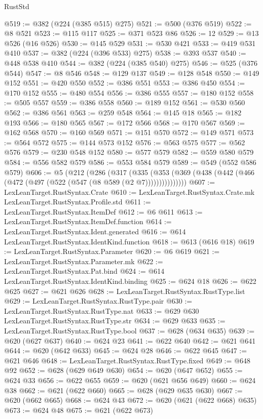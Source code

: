 \begin{lexlean}{RustStd}
\begin{coremodule}
@519 := @382 (@224 (@385 @515) @275)
@521 := @500 (@376 @519)
@522 := @8 @521
@523 := @115 @117
@525 := @371 @523 @86
@526 := 12
@529 := @13 @526 (@16 @526)
@530 := @145 @529
@531 := @530 @421
@533 := @419 @531 @410
@537 := @382 (@224 (@396 @533) @275)
@538 := @393 @537
@540 := @448 @538 @410
@544 := @382 (@224 (@385 @540) @275)
@546 := @525 (@376 @544)
@547 := @8 @546
@548 := @129 @137
@549 := @128 @548
@550 := @149 @152
@551 := @420 @550
@552 := @386 @551
@553 := @386 @450
@554 := @170 @152
@555 := @480 @554
@556 := @386 @555
@557 := @180 @152
@558 := @505 @557
@559 := @386 @558
@560 := @189 @152
@561 := @530 @560
@562 := @386 @561
@563 := @259 @548
@564 := @145 @18
@565 := @182 @193
@566 := @180 @565
@567 := @172 @566
@568 := @170 @567
@569 := @162 @568
@570 := @160 @569
@571 := @151 @570
@572 := @149 @571
@573 := @564 @572
@575 := @144 @573 @152
@576 := @563 @575
@577 := @562 @576
@579 := @230 @548 @152
@580 := @577 @579
@582 := @559 @580 @579
@584 := @556 @582 @579
@586 := @553 @584 @579
@589 := @549 (@552 @586 @579)
@606 := @5
    (@212
      (@286
        (@317
          (@335 (@353 (@369 (@438 (@442 (@466 (@472 (@497 (@522 (@547 (@8 @589 (@2 @7)))))))))))))))
@607 := LexLeanTarget.RustSyntax.Crate
@610 := LexLeanTarget.RustSyntax.Crate.mk LexLeanTarget.RustSyntax.Profile.std
@611 := LexLeanTarget.RustSyntax.ItemDef
@612 := @6 @611
@613 := LexLeanTarget.RustSyntax.ItemDef.function
@614 := LexLeanTarget.RustSyntax.Ident.generated
@616 := @614 LexLeanTarget.RustSyntax.IdentKind.function
@618 := @613 (@616 @18)
@619 := LexLeanTarget.RustSyntax.Parameter
@620 := @6 @619
@621 := LexLeanTarget.RustSyntax.Parameter.mk
@622 := LexLeanTarget.RustSyntax.Pat.bind
@624 := @614 LexLeanTarget.RustSyntax.IdentKind.binding
@625 := @624 @18
@626 := @622 @625
@627 := @621 @626
@628 := LexLeanTarget.RustSyntax.RustType.list
@629 := LexLeanTarget.RustSyntax.RustType.pair
@630 := LexLeanTarget.RustSyntax.RustType.nat
@633 := @629 @630 LexLeanTarget.RustSyntax.RustType.str
@634 := @629 @633
@635 := LexLeanTarget.RustSyntax.RustType.bool
@637 := @628 (@634 @635)
@639 := @620 (@627 @637)
@640 := @624 @23
@641 := @622 @640
@642 := @621 @641
@644 := @620 (@642 @633)
@645 := @624 @28
@646 := @622 @645
@647 := @621 @646
@648 := LexLeanTarget.RustSyntax.RustType.fixed
@649 := @648 @92
@652 := @628 (@629 @649 @630)
@654 := @620 (@647 @652)
@655 := @624 @33
@656 := @622 @655
@659 := @620 (@621 @656 @649)
@660 := @624 @38
@662 := @621 (@622 @660)
@665 := @628 (@629 @635 @630)
@667 := @620 (@662 @665)
@668 := @624 @43
@672 := @620 (@621 (@622 @668) @635)
@673 := @624 @48
@675 := @621 (@622 @673)

\end{coremodule}
\end{lexlean}
